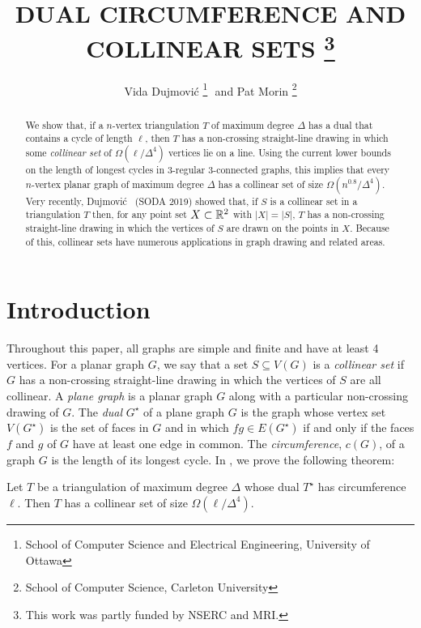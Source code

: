 \documentclass{patmorin}
\title{\MakeUppercase{Dual Circumference and Collinear Sets}%
    \thanks{This work was partly funded by NSERC and MRI.}}
\author{Vida Dujmovi\'c%
        \thanks{School of Computer Science and Electrical Engineering, 
                University of Ottawa}\,\, and 
        Pat Morin%
        \thanks{School of Computer Science, Carleton University}}
\newcommand{\dual}[1]{{#1}^\star}
\begin{document}
\maketitle


\begin{abstract}
   We show that, if a $n$-vertex triangulation $T$ of maximum degree
   $\Delta$ has a dual that contains a cycle of length $\ell$, then $T$
   has a non-crossing straight-line drawing in which some \emph{collinear
   set} of $\Omega(\ell/\Delta^4)$ vertices lie on a line.  Using the
   current lower bounds on the length of longest cycles in 3-regular
   3-connected graphs, this implies that every $n$-vertex planar
   graph of maximum degree $\Delta$ has a collinear set of size
   $\Omega(n^{0.8}/\Delta^4)$.  Very recently, Dujmovi\'c \etal\ (SODA
   2019) showed that, if $S$ is a collinear set in a triangulation $T$
   then, for any point set $X\subset\mathbb{R}^2$ with $|X|=|S|$, $T$ has a
   non-crossing straight-line drawing in which the vertices of $S$ are
   drawn on the points in $X$.  Because of this, collinear sets have
   numerous applications in graph drawing and related areas.
\end{abstract}

\section{Introduction}

Throughout this paper, all graphs are simple and finite and have at least
4 vertices.  For a planar graph $G$, we say that a set $S\subseteq V(G)$
is a \emph{collinear set} if $G$ has a non-crossing straight-line drawing
in which the vertices of $S$ are all collinear.  A \emph{plane graph}
is a planar graph $G$ along
with a particular non-crossing drawing of $G$.  The \emph{dual} $\dual{G}$
of a plane graph $G$ is the graph whose vertex set $V(\dual{G})$
is the set of faces in $G$ and in which $fg\in E(\dual{G})$ if and
only if the faces $f$ and $g$ of $G$ have at least one edge in common.
The \emph{circumference}, $c(G)$, of a graph $G$ is the length of its
longest cycle. In , we prove the following theorem:

\begin{thm}
  Let $T$ be a triangulation of maximum degree $\Delta$ whose dual
  $\dual{T}$ has circumference $\ell$. Then $T$ has a collinear set of
  size $\Omega(\ell/\Delta^4)$.
\end{thm}
\end{document}
